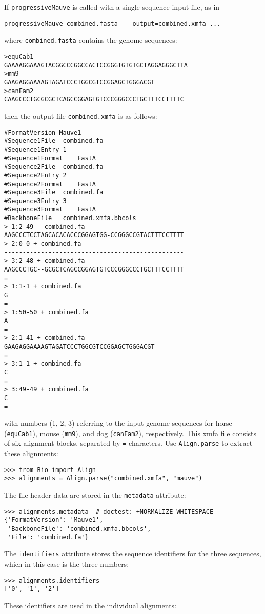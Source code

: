 If \verb|progressiveMauve| is called with a single sequence input file, as in
\begin{verbatim}
progressiveMauve combined.fasta  --output=combined.xmfa ...
\end{verbatim}
where \verb|combined.fasta| contains the genome sequences:
\begin{verbatim}
>equCab1
GAAAAGGAAAGTACGGCCCGGCCACTCCGGGTGTGTGCTAGGAGGGCTTA
>mm9
GAAGAGGAAAAGTAGATCCCTGGCGTCCGGAGCTGGGACGT
>canFam2
CAAGCCCTGCGCGCTCAGCCGGAGTGTCCCGGGCCCTGCTTTCCTTTTC
\end{verbatim}
then the output file \verb|combined.xmfa| is as follows:
\begin{verbatim}
#FormatVersion Mauve1
#Sequence1File	combined.fa
#Sequence1Entry	1
#Sequence1Format	FastA
#Sequence2File	combined.fa
#Sequence2Entry	2
#Sequence2Format	FastA
#Sequence3File	combined.fa
#Sequence3Entry	3
#Sequence3Format	FastA
#BackboneFile	combined.xmfa.bbcols
> 1:2-49 - combined.fa
AAGCCCTCCTAGCACACACCCGGAGTGG-CCGGGCCGTACTTTCCTTTT
> 2:0-0 + combined.fa
-------------------------------------------------
> 3:2-48 + combined.fa
AAGCCCTGC--GCGCTCAGCCGGAGTGTCCCGGGCCCTGCTTTCCTTTT
=
> 1:1-1 + combined.fa
G
=
> 1:50-50 + combined.fa
A
=
> 2:1-41 + combined.fa
GAAGAGGAAAAGTAGATCCCTGGCGTCCGGAGCTGGGACGT
=
> 3:1-1 + combined.fa
C
=
> 3:49-49 + combined.fa
C
=
\end{verbatim}
with numbers (1, 2, 3) referring to the input genome sequences for horse (\verb+equCab1+), mouse (\verb+mm9+), and dog (\verb+canFam2+), respectively.
This xmfa file consists of six alignment blocks, separated by \verb|=| characters. Use \verb|Align.parse| to extract these alignments:
\begin{verbatim}
>>> from Bio import Align
>>> alignments = Align.parse("combined.xmfa", "mauve")
\end{verbatim}
The file header data are stored in the \verb|metadata| attribute:
\begin{verbatim}
>>> alignments.metadata  # doctest: +NORMALIZE_WHITESPACE
{'FormatVersion': 'Mauve1',
 'BackboneFile': 'combined.xmfa.bbcols',
 'File': 'combined.fa'}
\end{verbatim}
The \verb|identifiers| attribute stores the sequence identifiers for the three sequences, which in this case is the three numbers:
\begin{verbatim}
>>> alignments.identifiers
['0', '1', '2']
\end{verbatim}
These identifiers are used in the individual alignments:
